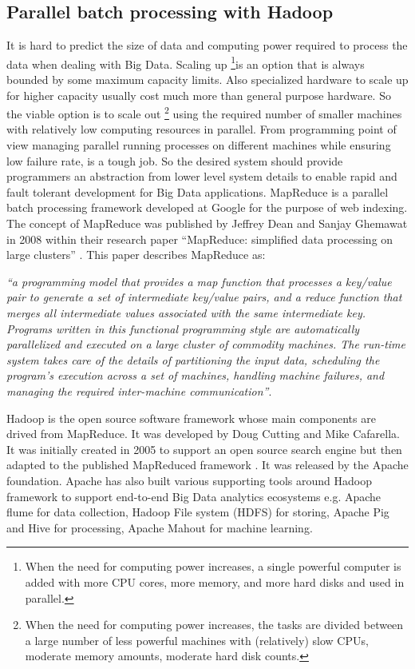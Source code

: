 \subsection{Parallel batch processing with Hadoop} \label{mapr} 
It is hard to predict the size of data and computing power required to process the data when dealing with Big Data. Scaling up  \footnote{When the need for computing power increases, a single powerful computer is added with more CPU cores, more memory, and more hard disks and used in parallel.}is an option that is always bounded by some maximum capacity limits. Also specialized hardware to scale up for higher capacity usually cost much more than general purpose hardware. So the viable option is to scale out \footnote{When the need for computing power increases, the tasks are divided between a large number of less powerful machines with (relatively) slow CPUs, moderate memory amounts, moderate hard disk counts.} using the required number of smaller machines with relatively low computing resources in parallel. From programming point of view managing parallel running processes on different machines while ensuring low failure rate, is a tough job. So the desired system should provide programmers an abstraction from lower level system details to enable rapid and fault tolerant development for Big Data applications.  MapReduce is a parallel batch processing framework developed at Google for the purpose of web indexing. The concept of MapReduce was published by Jeffrey Dean and Sanjay Ghemawat in 2008 within their research paper ``MapReduce: simplified data processing on large clusters''  \cite{dean2008mapreduce}. This paper describes MapReduce as: 

\emph{``a programming model that provides a map function that processes a key/value pair to generate a set of intermediate key/value pairs, and a reduce function that merges all intermediate values associated with the same intermediate key. Programs written in this functional programming style are automatically parallelized and executed on a large cluster of commodity machines. The run-time system takes care of the details of partitioning the input data, scheduling the program's execution across a set of machines, handling machine failures, and managing the required inter-machine communication''}.

Hadoop is the open source software framework whose main components are drived from MapReduce. It was developed by Doug Cutting and Mike Cafarella. It was initially created in 2005 to support an open source search engine but then adapted to the published MapReduced framework \cite{dean2008mapreduce}. It was released by the Apache foundation. Apache has also built various supporting tools around Hadoop framework to support end-to-end Big Data analytics ecosystems e.g. Apache flume for data collection, Hadoop File system (HDFS) for storing, Apache Pig and Hive for processing, Apache Mahout for machine learning.  

